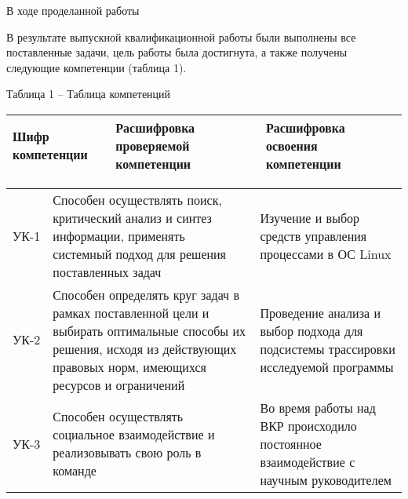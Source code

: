 \label{sec:conclusion}

В ходе проделанной работы 

В результате выпускной квалификационной работы были выполнены
все поставленные задачи, цель работы была достигнута, а также получены
следующие компетенции (таблица 1).

\noindent Таблица 1 -- Таблица компетенций
\vspace{5pt}

{
\fontsize{12}{9}\selectfont
\noindent \begin{tabular}{|P{2.2cm}|P{6.5cm}|P{6.5cm}|}
	\hline
{\bfseries\centering Шифр компетенции} &
	{\bfseries Расшифровка проверяемой компетенции} &
	{\bfseries Расшифровка освоения компетенции} \\
	\hline
\end{tabular}%
\vspace*{-12pt}
\noindent \begin{longtable}[c]{|p{2.2cm}|p{6.5cm}|p{6.5cm}|}
\endfirsthead
\caption*{\raggedright\hspace{-10pt} Продолжение таблицы 1\vspace*{-35pt}}\\
\endhead
УК-1 &
Способен осуществлять поиск, критический анализ и синтез информации, применять системный подход для решения поставленных задач &
Изучение и выбор средств управления процессами в ОС Linux
\\ \hline

УК-2 &
Способен определять круг задач в рамках поставленной цели и выбирать оптимальные способы их решения, исходя из действующих правовых норм, имеющихся ресурсов и ограничений &
Проведение анализа и выбор подхода для подсистемы трассировки исследуемой программы
\\ \hline

УК-3 &
Способен осуществлять социальное взаимодействие и реализовывать свою роль в команде &
Во время работы над ВКР происходило постоянное взаимодействие с научным руководителем
\\ \hline


\end{longtable}}
